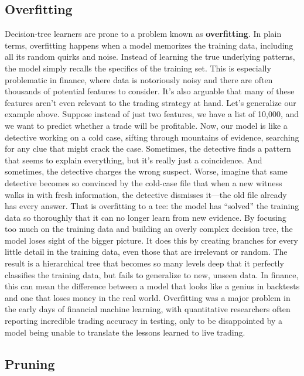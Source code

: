 \subsection{Overfitting}

Decision-tree learners are prone to a problem known as \textbf{overfitting}.
In plain terms, overfitting happens when a model memorizes the training data, including all its random quirks and noise.
Instead of learning the true underlying patterns, the model simply recalls the specifics of the training set.
This is especially problematic in finance, where data is notoriously noisy and there are often thousands of potential features to consider.
It's also arguable that many of these features aren't even relevant to the trading strategy at hand.
Let's generalize our example above. Suppose instead of just two features, we have a list of 10,000, and we want to predict whether a trade will be profitable.
Now, our model is like a detective working on a cold case, sifting through mountains of evidence, searching for any clue that might crack the case.
Sometimes, the detective finds a pattern that seems to explain everything, but it's really just a coincidence. And sometimes, the detective charges the wrong suspect.
Worse, imagine that same detective becomes so convinced by the cold-case file that when a new witness walks in with fresh information, the detective dismisses it---the old file already has every answer. That is overfitting to a tee: the model has ``solved'' the training data so thoroughly that it can no longer learn from new evidence.
By focusing too much on the training data and building an overly complex decision tree, the model loses sight of the bigger picture.
It does this by creating branches for every little detail in the training data, even those that are irrelevant or random.
The result is a hierarchical tree that becomes so many levels deep that it perfectly classifies the training data, but fails to generalize to new, unseen data.
In finance, this can mean the difference between a model that looks like a genius in backtests and one that loses money in the real world.
Overfitting was a major problem in the early days of financial machine learning, with quantitative researchers often reporting incredible trading accuracy in testing, only to be disappointed by a model being unable to translate the lessons learned to live trading.

\subsection{Pruning}

